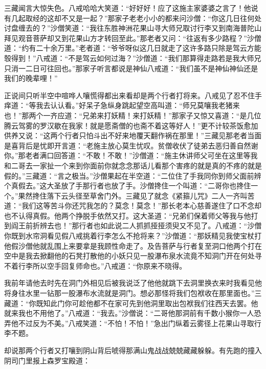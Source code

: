 \documentclass[12pt,UTF8]{ctexbook}
\begin{document}
三藏闻言大惊失色。八戒哈哈大笑道：“好好好！应了这施主家婆婆之言了！他说有几起取经的这却不又是一起？”那家子老老小小的都来问沙僧：“你这几日往何处讨盘缠去的？”沙僧笑道：“我往东胜神洲花果山寻大师兄取讨行李又到南海普陀山拜见观音菩萨却又到花果山方才转回至此。”那老者又问：“往返有多少路程？”沙僧道：“约有二十余万里。”老者道：“爷爷呀似这几日就走了这许多路只除是驾云方能彀得到！”八戒道：“不是驾云如何过海？”沙僧道：“我们那算得走路若是我大师兄只消一二日可往回也。”那家子听言都说是神仙八戒道：“我们虽不是神仙神仙还是我们的晚辈哩！”

正说间只听半空中喧哗人嚷慌得都出来看却是两个行者打将来。八戒见了忍不住手痒道：“等我去认认看。”好呆子急纵身跳起望空高叫道：“师兄莫嚷我老猪来也！”那两个一齐应道：“兄弟来打妖精！来打妖精！”那家子又惊又喜道：“是几位腾云驾雾的罗汉歇在我家！就是愿斋僧的也斋不着这等好人！”更不计较茶饭愈加供养又说：“这两个行者只怕斗出不好来地覆天翻作祸在那里！”三藏见那老者当面是喜背后是忧即开言道：“老施主放心莫生忧叹。贫僧收伏了徒弟去恶归善自然谢你。”那老者满口回答道：“不敢！不敢！”沙僧道：“施主休讲师父可坐在这里等我和二哥去一家扯一个来到你面前你就念念那话儿看那个害疼的就是真的不疼的就是假的。”三藏道：“言之极当。”沙僧果起在半空道：“二位住了手我同你到师父面前辨个真假去。”这大圣放了手那行者也放了手。沙僧搀住一个叫道：“二哥你也搀住一个。”果然搀住落下云头径至草舍门外。三藏见了就念《紧箍儿咒》二人一齐叫苦道：“我们这等苦斗你还咒我怎的？莫念！莫念！”那长老本心慈善遂住了口不念却也不认得真假。他两个挣脱手依然又打。这大圣道：“兄弟们保着师父等我与他打到阎王前折辨去也！”那行者也如此说二人抓抓挜挜须臾又不见了。八戒道：“沙僧你既到水帘洞看见假八戒挑着行李怎么不抢将来？”沙僧道：“那妖精见我使宝杖打他假沙僧他就乱围上来要拿是我顾性命走了。及告菩萨与行者复至洞口他两个打在空中是我去掀翻他的石凳打散他的小妖只见一股瀑布泉水流竟不知洞门开在何处寻不着行李所以空手回复师命也。”八戒道：“你原来不晓得。

我前年请他去时先在洞门外相见后被我说泛了他他就跳下去洞里换衣来时我看见他将身往水里一钻那一股瀑布水流就是洞门。想必那怪将我们包袱收在那里面也。”三藏道：“你既知此门你可趁他都不在家可先到他洞里取出包袱我们往西天去罢。他就来我也不用他了。”八戒道：“我去。”沙僧说：“二哥他那洞前有千数小猴你一人恐弄他不过反为不美。”八戒笑道：“不怕！不怕！”急出门纵着云雾径上花果山寻取行李不题。

却说那两个行者又打嚷到阴山背后唬得那满山鬼战战兢兢藏藏躲躲。有先跑的撞入阴司门里报上森罗宝殿道：
\end{document}

